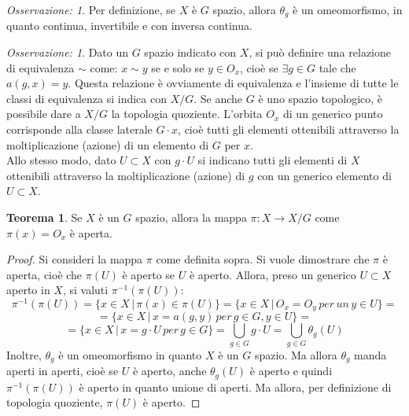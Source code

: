 \documentclass[12pt,a4paper]{report}
\theoremstyle{definition}
\newtheorem{Theo}[Def]{Teorema}
\theoremstyle{definition}
\theoremstyle{definition}
\theoremstyle{remark}
\newtheorem{Obs}[Def]{Osservazione:}
\begin{document}
\begin{Obs}
	Per definizione, se $X$ è $G$ spazio, allora $\theta_g$ è un omeomorfismo, in quanto continua, invertibile e con inversa continua.
\end{Obs}
\begin{Obs}
	Dato un $G$ spazio indicato con $X$, si può definire una relazione di equivalenza $\sim$ come: $x\sim y$ se e solo se $y\in O_x$, cioè se $\exists g\in G$ tale che $a(g,x)=y$. Questa relazione è ovviamente di equivalenza e l'insieme di tutte le classi di equivalenza si indica con $X/G$. Se anche $G$ è uno spazio topologico, è possibile dare a $X/G$ la topologia quoziente. 
	L'orbita $O_x$ di un generico punto corrisponde alla classe laterale $G\cdot x$, cioè tutti gli elementi ottenibili attraverso la moltiplicazione (azione) di un elemento di $G$ per $x$. \\
	Allo stesso modo, dato $U\subset X$ con $g\cdot U$ si indicano tutti gli elementi di $X$ ottenibili attraverso la moltiplicazione (azione) di $g$ con un generico elemento di $U\subset X$. 
\end{Obs}
\begin{Theo}
	Se $X$ è un $G$ spazio, allora la mappa $\pi:X\rightarrow X/G$ come $\pi(x)=O_x$ è aperta.
\end{Theo}
\begin{proof}
	Si consideri la mappa $\pi$ come definita sopra. Si vuole dimostrare che $\pi$ è aperta, cioè che $\pi(U)$ è aperto se $U$ è aperto. Allora, preso un generico $U\subset X$ aperto in $X$, si valuti $\pi^{-1}(\pi(U))$:
	$$\pi^{-1}(\pi(U))=\{x\in X \,|\, \pi(x)\in \pi(U)\}=\{x\in X \,|\, O_x=O_y \, per \, un \, y\in U\}=$$
	$$=\{x\in X \, | \, x=a(g,y) \, per \, g\in G, y\in U\}=$$
	$$=\{x\in X \, | \, x=g\cdot U \, per \, g\in G\}= \bigcup_{g\in G} g\cdot U=\bigcup_{g\in G}\theta_g(U)$$
	Inoltre, $\theta_g$ è un omeomorfismo in quanto $X$ è un $G$ spazio. Ma allora $\theta_g$ manda aperti in aperti, cioè se $U$ è aperto, anche $\theta_g(U)$ è aperto e quindi $\pi^{-1}(\pi(U))$ è aperto in quanto unione di aperti. Ma allora, per definizione di topologia quoziente, $\pi(U)$ è aperto.
\end{proof}
\end{document}
